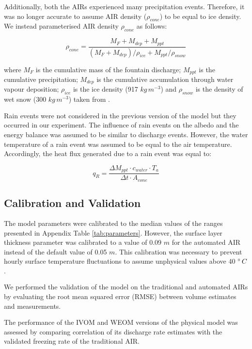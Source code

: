 \documentclass[tc, manuscript]{copernicus}
\begin{document}
Additionally, both the AIRs experienced many precipitation events. Therefore, it was no longer accurate to
assume AIR density ($\rho_{cone}$) to be equal to ice density. We instead parameterised AIR density $\rho_{cone}$ as follows:

\begin{equation}
  \rho_{cone} = \frac{M_{F} + M_{dep} + M_{ppt}}{(M_{F} + M_{dep})/\rho_{ice} + M_{ppt}/\rho_{snow}}
\end{equation}

where $M_F$ is the cumulative mass of the fountain discharge; $M_{ppt}$ is the cumulative precipitation;
$M_{dep}$ is the cumulative accumulation through water vapour deposition; $\rho_{ice}$ is the ice density (917
$kg\,m^{-3}$) and $\rho_{snow}$ is the density of wet snow (300 $kg\,m^{-3}$) taken from
\cite{cuffeyPhysicsGlaciers2010} .

Rain events were not considered in the previous version of the model but they occurred in our experiment. The
influence of rain events on the albedo and the energy balance was assumed to be similar to discharge
events. However, the water temperature of a rain event was assumed to be equal to the air temperature.
Accordingly, the heat flux generated due to a rain event was equal to:

\begin{equation}
  q_{R} = \frac{\Delta M_{ppt} \cdot c_{water} \cdot T_{a}}{\Delta t \cdot A_{cone}}
\end{equation}

\subsection{Calibration and Validation}

The model parameters were calibrated to the median values of the ranges presented in Appendix Table
\ref{tab:parameters}. However, the surface layer thickness parameter was calibrated to a value of 0.09 $m$ for the
automated AIR instead of the default value of 0.05 $m$. This calibration was necessary to prevent hourly surface
temperature fluctuations to assume unphysical values above 40 $^{\circ}\,C$.

We performed the validation of the model on the traditional and automated AIRs by evaluating the root mean
squared error (RMSE) between volume estimates and measurements. 

The performance of the IVOM and WEOM versions of the physical model was assessed by comparing correlation of its
discharge rate estimates with the validated freezing rate of the traditional AIR.
\end{document}
